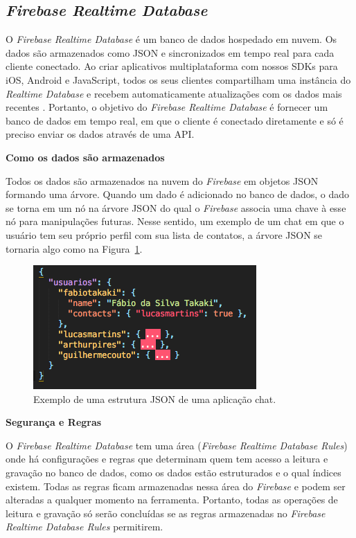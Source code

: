 \documentclass[12pt]{article}
\begin{document}
\subsection{\textit{Firebase Realtime Database}}

O \textit{Firebase Realtime Database} é um banco de dados hospedado em nuvem. Os dados são armazenados como JSON e sincronizados em tempo real para cada cliente conectado. Ao criar aplicativos multiplataforma com nossos SDKs para iOS, Android e JavaScript, todos os seus clientes compartilham uma instância do \textit{Realtime Database} e recebem automaticamente atualizações com os dados mais recentes \cite{Firebase}. Portanto, o objetivo do \textit{Firebase Realtime Database} é fornecer um banco de dados em tempo real, em que o cliente é conectado diretamente e só é preciso enviar os dados através de uma API.

\textbf{Como os dados são armazenados}

Todos os dados são armazenados na nuvem do \textit{Firebase} em objetos JSON formando uma árvore. Quando um dado é adicionado no banco de dados, o dado se torna em um nó na árvore JSON do qual o \textit{Firebase} associa uma chave à esse nó para manipulações futuras. Nesse sentido, um exemplo de um chat em que o usuário tem seu próprio perfil com sua lista de contatos, a árvore JSON se tornaria algo como na Figura~\ref{fig:json-tree}.

\begin{figure}[ht]
\centering
\includegraphics[width=.5\textwidth]{json-tree.png}
\caption{Exemplo de uma estrutura JSON de uma aplicação chat.}
\label{fig:json-tree}
\end{figure}


\textbf{Segurança e Regras}

O \textit{Firebase Realtime Database} tem uma área (\textit{Firebase Realtime Database Rules}) onde há configurações e regras que determinam quem tem acesso a leitura e gravação no banco de dados, como os dados estão estruturados e o qual índices existem. Todas as regras ficam armazenadas nessa área do \textit{Firebase} e podem ser alteradas a qualquer momento na ferramenta. Portanto, todas as operações de leitura e gravação só serão concluídas se as regras armazenadas no \textit{Firebase Realtime Database Rules} permitirem. 
\end{document}
